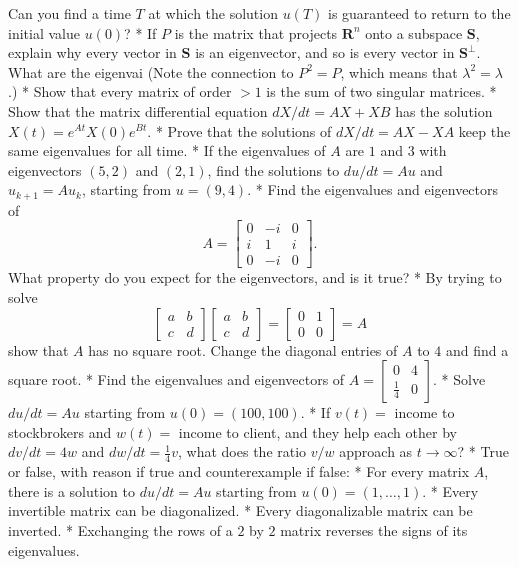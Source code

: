 Can you find a time \(T\) at which the solution \(u(T)\) is guaranteed to return to the initial value \(u(0)\)?
* If \(P\) is the matrix that projects \(\mathbf{R}^{n}\) onto a subspace \(\mathbf{S}\), explain why every vector in \(\mathbf{S}\) is an eigenvector, and so is every vector in \(\mathbf{S}^{\perp}\). What are the eigenvai (Note the connection to \(P^{2}=P\), which means that \(\lambda^{2}=\lambda\).)
* Show that every matrix of order \(>1\) is the sum of two singular matrices.
* Show that the matrix differential equation \(dX/dt=AX+XB\) has the solution \(X(t)=e^{At}X(0)e^{Bt}\).
* Prove that the solutions of \(dX/dt=AX-XA\) keep the same eigenvalues for all time.
* If the eigenvalues of \(A\) are \(1\) and \(3\) with eigenvectors \((5,2)\) and \((2,1)\), find the solutions to \(du/dt=Au\) and \(u_{k+1}=Au_{k}\), starting from \(u=(9,4)\).
* Find the eigenvalues and eigenvectors of \[A=\begin{bmatrix}0&-i&0\\ i&1&i\\ 0&-i&0\end{bmatrix}.\] What property do you expect for the eigenvectors, and is it true?
* By trying to solve \[\begin{bmatrix}a&b\\ c&d\end{bmatrix}\begin{bmatrix}a&b\\ c&d\end{bmatrix}=\begin{bmatrix}0&1\\ 0&0\end{bmatrix}=A\] show that \(A\) has no square root. Change the diagonal entries of \(A\) to \(4\) and find a square root.
* Find the eigenvalues and eigenvectors of \(A=\begin{bmatrix}0&4\\ \frac{1}{4}&0\end{bmatrix}\).
* Solve \(du/dt=Au\) starting from \(u(0)=(100,100)\).
* If \(v(t)=\) income to stockbrokers and \(w(t)=\) income to client, and they help each other by \(dv/dt=4w\) and \(dw/dt=\frac{1}{4}v\), what does the ratio \(v/w\) approach as \(t\to\infty\)?
* True or false, with reason if true and counterexample if false:
* For every matrix \(A\), there is a solution to \(du/dt=Au\) starting from \(u(0)=(1,\ldots,1)\).
* Every invertible matrix can be diagonalized.
* Every diagonalizable matrix can be inverted.
* Exchanging the rows of a \(2\) by \(2\) matrix reverses the signs of its eigenvalues.
 